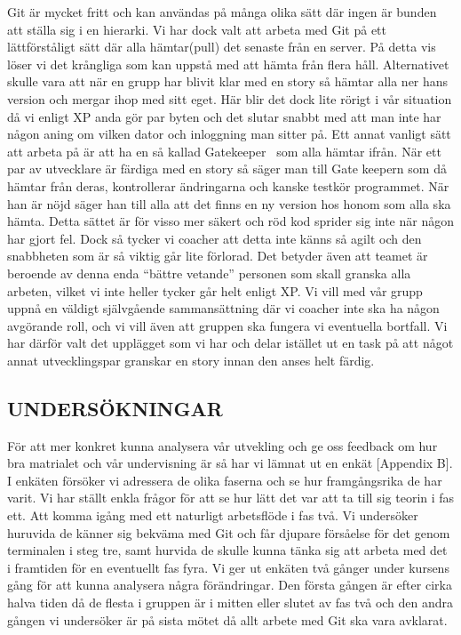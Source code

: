 Git är mycket fritt och kan användas på många olika sätt där ingen är bunden att ställa sig i en hierarki. Vi har dock valt att arbeta med Git på ett lättförståligt sätt där alla hämtar(pull) det senaste från en server. På detta vis löser vi det krångliga som kan uppstå med att hämta från flera håll. Alternativet skulle vara att när en grupp har blivit klar med en story så hämtar alla ner hans version och mergar ihop med sitt eget. Här blir det dock lite rörigt i vår situation då vi enligt XP anda gör par byten och det slutar snabbt med att man inte har någon aning om vilken dator och inloggning man sitter på. Ett annat vanligt sätt att arbeta på är att ha en så kallad Gatekeeper~\cite{Gatekeeper} som alla hämtar ifrån. När ett par av utvecklare är färdiga med en story så säger man till Gate keepern som då hämtar från deras, kontrollerar ändringarna och kanske testkör programmet. När han är nöjd säger han till alla att det finns en ny version hos honom som alla ska hämta. Detta sättet är för visso mer säkert och röd kod sprider sig inte när någon har gjort fel. Dock så tycker vi coacher att detta inte känns så agilt och den snabbheten som är så viktig går lite förlorad. Det betyder även att teamet är beroende av denna enda “bättre vetande” personen som skall granska alla arbeten, vilket vi inte heller tycker går helt enligt XP. Vi vill med vår grupp uppnå en väldigt självgående sammansättning där vi coacher inte ska ha någon avgörande roll, och vi vill även att gruppen ska fungera vi eventuella bortfall. 
Vi har därför valt det upplägget som vi har och delar istället ut en task på att något annat utvecklingspar granskar en story innan den anses helt färdig. 


\subsection{UNDERSÖKNINGAR}

För att mer konkret kunna analysera vår utvekling och ge oss feedback om hur bra matrialet och vår undervisning är så har vi lämnat ut en enkät [Appendix B]. I enkäten försöker vi adressera de olika faserna och se hur framgångsrika de har varit. Vi har ställt enkla frågor för att se hur lätt det var att ta till sig teorin i fas ett. Att komma igång med ett naturligt arbetsflöde i fas två. Vi undersöker huruvida de känner sig bekväma med Git och får djupare försåelse för det genom terminalen i steg tre, samt hurvida de skulle kunna tänka sig att arbeta med det i framtiden för en eventuellt fas fyra. Vi ger ut enkäten två gånger under kursens gång för att kunna analysera några förändringar. Den första gången är efter cirka halva tiden då de flesta i gruppen är i mitten eller slutet av fas två och den andra gången vi undersöker är på sista mötet då allt arbete med Git ska vara avklarat. 